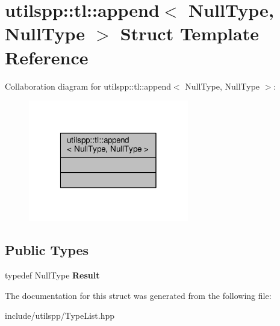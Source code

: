 \hypertarget{structutilspp_1_1tl_1_1append_3_01NullType_00_01NullType_01_4}{\section{utilspp\-:\-:tl\-:\-:append$<$ Null\-Type, Null\-Type $>$ Struct Template Reference}
\label{structutilspp_1_1tl_1_1append_3_01NullType_00_01NullType_01_4}
}


Collaboration diagram for utilspp\-:\-:tl\-:\-:append$<$ Null\-Type, Null\-Type $>$\-:\nopagebreak
\begin{figure}[H]
\begin{center}
\leavevmode
\includegraphics[width=198pt]{structutilspp_1_1tl_1_1append_3_01NullType_00_01NullType_01_4__coll__graph}
\end{center}
\end{figure}
\subsection*{Public Types}
\begin{DoxyCompactItemize}
\item 
\hypertarget{structutilspp_1_1tl_1_1append_3_01NullType_00_01NullType_01_4_a31a31ee2d8b5e3482cad92a628f8bff7}{typedef Null\-Type {\bfseries Result}}\label{structutilspp_1_1tl_1_1append_3_01NullType_00_01NullType_01_4_a31a31ee2d8b5e3482cad92a628f8bff7}

\end{DoxyCompactItemize}


The documentation for this struct was generated from the following file\-:\begin{DoxyCompactItemize}
\item 
include/utilspp/Type\-List.\-hpp\end{DoxyCompactItemize}
